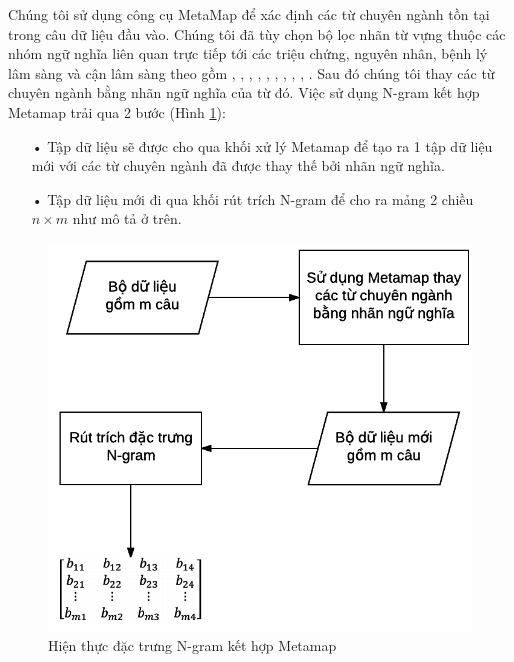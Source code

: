 Chúng tôi sử dụng công cụ MetaMap để xác định các từ chuyên ngành tồn tại trong câu dữ liệu đầu vào. Chúng tôi đã tùy chọn bộ lọc nhãn từ vựng thuộc các nhóm ngữ nghĩa liên quan trực tiếp tới các triệu chứng, nguyên nhân, bệnh lý lâm sàng và cận lâm sàng theo \cite{sarker2011outcome} gồm , , , , , , , , , . Sau đó chúng tôi thay các từ chuyên ngành bằng nhãn ngữ nghĩa của từ đó. 
Việc sử dụng N-gram kết hợp Metamap trải qua 2 bước (Hình \ref{fig:hien-thuc-metamap}):
\begin{itemize}
\item[•] Tập dữ liệu sẽ được cho qua khối xử lý Metamap để tạo ra 1 tập dữ liệu mới với các từ chuyên ngành đã được thay thế bởi nhãn ngữ nghĩa.
\item[•] Tập dữ liệu mới đi qua khối rút trích N-gram để cho ra mảng 2 chiều $n \times m$ như mô tả ở trên.
\end{itemize}
\begin{figure}[h]
\centering
\includegraphics[scale=0.7]{../hinh/hien_thuc_metamap.png}
\caption{Hiện thực đặc trưng N-gram kết hợp Metamap} \label{fig:hien-thuc-metamap}
\end{figure}

